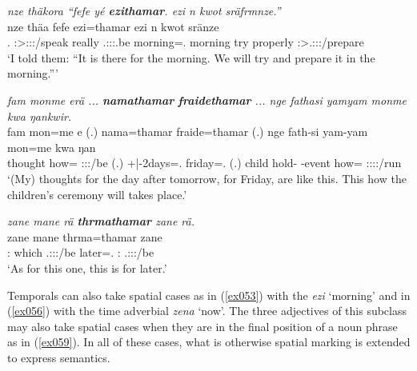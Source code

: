 \begin{exe}
	\ex \emph{nze thäkora ``fefe yé \textbf{ezithamar}. ezi n kwot sräfrmnze.''}\\
	\gll nze thäa fefe  ezi=thamar ezi n kwot sränze\\
	\Fsg.\Erg{} \Fsg:\Sbj>\Stpl:\Obj:\Pst:\Pfv/speak really \Tsg.\Masc:\Sbj:\Nonpast:\Ipfv.be morning=\Temp.\Purp{} morning try properly \Fpl:\Sbj>\Tsg.\Masc:\Obj:\Irr:\Ipfv/prepare\\
	\trans `I told them: ``It is there for the morning. We will try and prepare it in the morning.''' 
	\label{ex057}
\end{exe}
\begin{exe}
	\ex \emph{fam monme erä ... \textbf{namathamar} \textbf{fraidethamar} ... nge fathasi yamyam monme kwa ŋankwir.}\\
	\gll fam mon=me e (.) nama=thamar fraide=thamar (.) nge fath-si yam-yam mon=me kwa ŋan\\
	thought how=\Ins{} \Stpl:\Sbj:\Nonpast:\Ipfv/be (.) +|-2days=\Temp.\Purp{} friday=\Temp.\Purp{} (.) child hold-\Nmlz{} \Redup{}-event how=\Ins{} \Fut{} \Stsg:\Sbj:\Nonpast:\Ipfv:\Venit/run\\
	\trans `(My) thoughts for the day after tomorrow, for Friday, are like this. This how the children's ceremony will takes place.' 
	\label{ex055}
\end{exe}
\begin{exe}
	\ex \emph{zane mane rä \textbf{thrmathamar} zane rä.}\\
	\gll zane mane  thrma=thamar zane \\
	\Dem:\Prox{} which \Tsg.\F:\Sbj:\Nonpast:\Ipfv/be later=\Temp.\Purp{} \Dem:\Prox{} \Tsg.\F:\Sbj:\Nonpast:\Ipfv/be\\
	\trans `As for this one, this is for later.' 
	\label{ex058}
\end{exe}

Temporals can also take spatial cases as in (\ref{ex053}) with the   \emph{ezi} `morning' and in (\ref{ex056}) with the time adverbial \emph{zena} `now'. The three adjectives of this subclass may also take spatial cases when they are in the final position of a noun phrase as in (\ref{ex059}). In all of these cases, what is otherwise spatial marking is extended to express  semantics.

